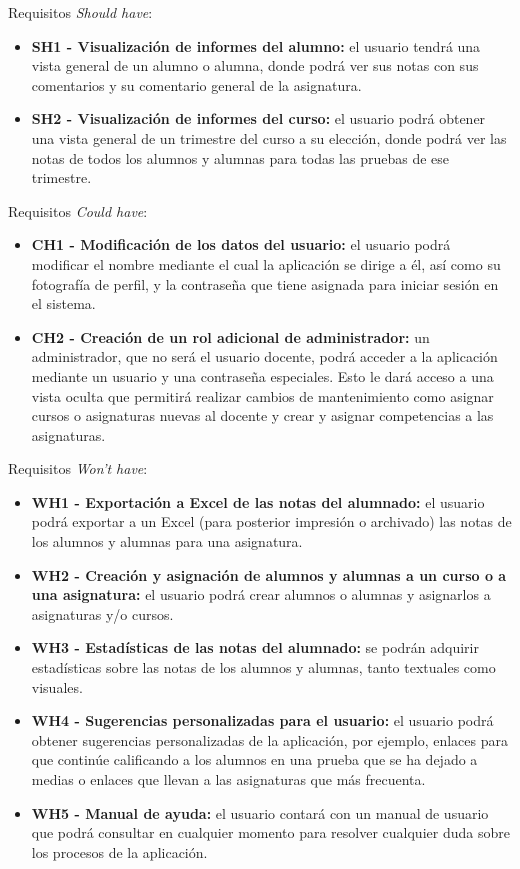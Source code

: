 Requisitos \textit{Should have}:
\begin{itemize}
	\item \textbf{SH1 - Visualización de informes del alumno:} el usuario tendrá una vista general de un alumno o alumna, donde podrá ver sus notas con sus comentarios y su comentario general de la asignatura.
	\item \textbf{SH2 - Visualización de informes del curso:} el usuario podrá obtener una vista general de un trimestre del curso a su elección, donde podrá ver las notas de todos los alumnos y alumnas para todas las pruebas de ese trimestre.
\end{itemize}

Requisitos \textit{Could have}:
\begin{itemize}
	\item \textbf{CH1 - Modificación de los datos del usuario:} el usuario podrá modificar el nombre mediante el cual la aplicación se dirige a él, así como su fotografía de perfil, y la contraseña que tiene asignada para iniciar sesión en el sistema.
	\item \textbf{CH2 - Creación de un rol adicional de administrador:} un administrador, que no será el usuario docente, podrá acceder a la aplicación mediante un usuario y una contraseña especiales. Esto le dará acceso a una vista oculta que permitirá realizar cambios de mantenimiento como asignar cursos o asignaturas nuevas al docente y crear y asignar competencias a las asignaturas.
\end{itemize}

Requisitos \textit{Won't have}:
\begin{itemize}
	\item \textbf{WH1 - Exportación a Excel de las notas del alumnado:} el usuario podrá exportar a un Excel (para posterior impresión o archivado) las notas de los alumnos y alumnas para una asignatura.
	\item \textbf{WH2 - Creación y asignación de alumnos y alumnas a un curso o a una asignatura:} el usuario podrá crear alumnos o alumnas y asignarlos a asignaturas y/o cursos.
	\item \textbf{WH3 - Estadísticas de las notas del alumnado:} se podrán adquirir estadísticas sobre las notas de los alumnos y alumnas, tanto textuales como visuales.
	\item \textbf{WH4 - Sugerencias personalizadas para el usuario:} el usuario podrá obtener sugerencias personalizadas de la aplicación, por ejemplo, enlaces para que continúe calificando a los alumnos en una prueba que se ha dejado a medias o enlaces que llevan a las asignaturas que más frecuenta.
	\item \textbf{WH5 - Manual de ayuda:} el usuario contará con un manual de usuario que podrá consultar en cualquier momento para resolver cualquier duda sobre los procesos de la aplicación.
\end{itemize}


